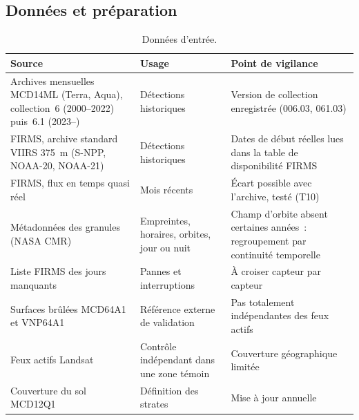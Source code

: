 \documentclass[11pt,a4paper]{article}
\begin{document}
\subsection{Données et préparation}\label{sec:donnees}

\begin{table}[h]
\centering\small
\caption{Données d'entrée.}
\begin{tabularx}{\linewidth}{>{\raggedright\arraybackslash}p{4.2cm} Y Y}
\toprule
Source & Usage & Point de vigilance \\
\midrule
Archives mensuelles MCD14ML (Terra, Aqua), collection~6 (2000--2022) puis~6.1 (2023--) & Détections historiques & Version de collection enregistrée (006.03, 061.03) \\
FIRMS, archive standard VIIRS 375~m (S-NPP, NOAA-20, NOAA-21) & Détections historiques & Dates de début réelles lues dans la table de disponibilité FIRMS \\
FIRMS, flux en temps quasi réel & Mois récents & Écart possible avec l'archive, testé (T10) \\
Métadonnées des granules (NASA CMR) & Empreintes, horaires, orbites, jour ou nuit & Champ d'orbite absent certaines années~: regroupement par continuité temporelle \\
Liste FIRMS des jours manquants~\cite{firmsmissing} & Pannes et interruptions & À croiser capteur par capteur \\
Surfaces brûlées MCD64A1 et VNP64A1~\cite{giglio2025} & Référence externe de validation & Pas totalement indépendantes des feux actifs \\
Feux actifs Landsat & Contrôle indépendant dans une zone témoin & Couverture géographique limitée \\
Couverture du sol MCD12Q1 & Définition des strates & Mise à jour annuelle \\
\bottomrule
\end{tabularx}
\end{table}
\end{document}
